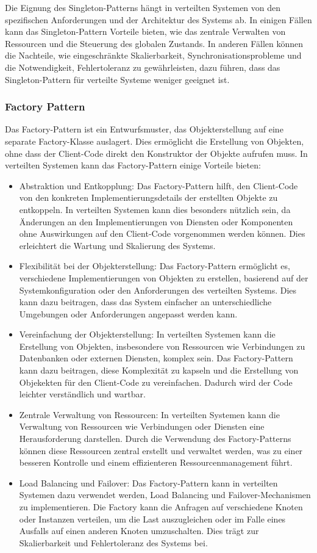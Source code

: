Die Eignung des Singleton-Patterns hängt in verteilten Systemen von den spezifischen Anforderungen und der Architektur des Systems ab. In einigen Fällen kann das Singleton-Pattern Vorteile bieten, wie das zentrale Verwalten von Ressourcen und die Steuerung des globalen Zustands. In anderen Fällen können die Nachteile, wie eingeschränkte Skalierbarkeit, Synchronisationsprobleme und die Notwendigkeit, Fehlertoleranz zu gewährleisten, dazu führen, dass das Singleton-Pattern für verteilte Systeme weniger geeignet ist.

\subsubsection{Factory Pattern}
Das Factory-Pattern ist ein Entwurfsmuster, das Objekterstellung auf eine separate Factory-Klasse auslagert. Dies ermöglicht die Erstellung von Objekten, ohne dass der Client-Code direkt den Konstruktor der Objekte aufrufen muss. In verteilten Systemen kann das Factory-Pattern einige Vorteile bieten:
\begin{itemize}
\item Abstraktion und Entkopplung: Das Factory-Pattern hilft, den Client-Code von den konkreten Implementierungsdetails der erstellten Objekte zu entkoppeln. In verteilten Systemen kann dies besonders nützlich sein, da Änderungen an den Implementierungen von Diensten oder Komponenten ohne Auswirkungen auf den Client-Code vorgenommen werden können. Dies erleichtert die Wartung und Skalierung des Systems.
\item Flexibilität bei der Objekterstellung: Das Factory-Pattern ermöglicht es, verschiedene Implementierungen von Objekten zu erstellen, basierend auf der Systemkonfiguration oder den Anforderungen des verteilten Systems. Dies kann dazu beitragen, dass das System einfacher an unterschiedliche Umgebungen oder Anforderungen angepasst werden kann.
\item Vereinfachung der Objekterstellung: In verteilten Systemen kann die Erstellung von Objekten, insbesondere von Ressourcen wie Verbindungen zu Datenbanken oder externen Diensten, komplex sein. Das Factory-Pattern kann dazu beitragen, diese Komplexität zu kapseln und die Erstellung von Objekekten für den Client-Code zu vereinfachen. Dadurch wird der Code leichter verständlich und wartbar.
\item Zentrale Verwaltung von Ressourcen: In verteilten Systemen kann die Verwaltung von Ressourcen wie Verbindungen oder Diensten eine Herausforderung darstellen. Durch die Verwendung des Factory-Patterns können diese Ressourcen zentral erstellt und verwaltet werden, was zu einer besseren Kontrolle und einem effizienteren Ressourcenmanagement führt.
\item Load Balancing und Failover: Das Factory-Pattern kann in verteilten Systemen dazu verwendet werden, Load Balancing und Failover-Mechanismen zu implementieren. Die Factory kann die Anfragen auf verschiedene Knoten oder Instanzen verteilen, um die Last auszugleichen oder im Falle eines Ausfalls auf einen anderen Knoten umzuschalten. Dies trägt zur Skalierbarkeit und Fehlertoleranz des Systems bei.
\end{itemize}
